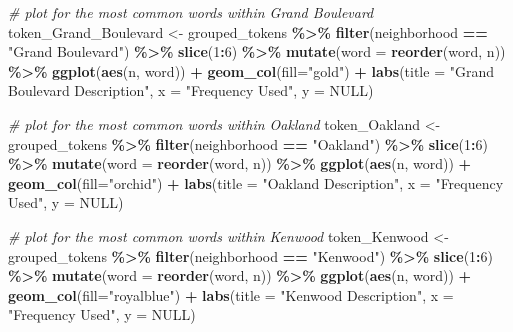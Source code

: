 \documentclass[
]{article}
\newenvironment{Shaded}{\begin{snugshade}}{\end{snugshade}}
\newcommand{\AttributeTok}[1]{\textcolor[rgb]{0.13,0.29,0.53}{#1}}
\newcommand{\CommentTok}[1]{\textcolor[rgb]{0.56,0.35,0.01}{\textit{#1}}}
\newcommand{\ConstantTok}[1]{\textcolor[rgb]{0.56,0.35,0.01}{#1}}
\newcommand{\DecValTok}[1]{\textcolor[rgb]{0.00,0.00,0.81}{#1}}
\newcommand{\FunctionTok}[1]{\textcolor[rgb]{0.13,0.29,0.53}{\textbf{#1}}}
\newcommand{\NormalTok}[1]{#1}
\newcommand{\OtherTok}[1]{\textcolor[rgb]{0.56,0.35,0.01}{#1}}
\newcommand{\SpecialCharTok}[1]{\textcolor[rgb]{0.81,0.36,0.00}{\textbf{#1}}}
\newcommand{\StringTok}[1]{\textcolor[rgb]{0.31,0.60,0.02}{#1}}
\begin{document}
\begin{Shaded}
\begin{Highlighting}[]
\CommentTok{\# plot for the most common words within Grand Boulevard}
\NormalTok{token\_Grand\_Boulevard }\OtherTok{\textless{}{-}}\NormalTok{ grouped\_tokens }\SpecialCharTok{\%\textgreater{}\%}
  \FunctionTok{filter}\NormalTok{(neighborhood }\SpecialCharTok{==} \StringTok{"Grand Boulevard"}\NormalTok{) }\SpecialCharTok{\%\textgreater{}\%}
  \FunctionTok{slice}\NormalTok{(}\DecValTok{1}\SpecialCharTok{:}\DecValTok{6}\NormalTok{) }\SpecialCharTok{\%\textgreater{}\%}
  \FunctionTok{mutate}\NormalTok{(}\AttributeTok{word =} \FunctionTok{reorder}\NormalTok{(word, n)) }\SpecialCharTok{\%\textgreater{}\%}
  \FunctionTok{ggplot}\NormalTok{(}\FunctionTok{aes}\NormalTok{(n, word)) }\SpecialCharTok{+}
  \FunctionTok{geom\_col}\NormalTok{(}\AttributeTok{fill=}\StringTok{"gold"}\NormalTok{) }\SpecialCharTok{+}
  \FunctionTok{labs}\NormalTok{(}\AttributeTok{title =} \StringTok{"Grand Boulevard Description"}\NormalTok{, }\AttributeTok{x =} \StringTok{"Frequency Used"}\NormalTok{, }\AttributeTok{y =} \ConstantTok{NULL}\NormalTok{)}

\CommentTok{\# plot for the most common words within Oakland}
\NormalTok{token\_Oakland }\OtherTok{\textless{}{-}}\NormalTok{ grouped\_tokens }\SpecialCharTok{\%\textgreater{}\%}
  \FunctionTok{filter}\NormalTok{(neighborhood }\SpecialCharTok{==} \StringTok{"Oakland"}\NormalTok{) }\SpecialCharTok{\%\textgreater{}\%}
  \FunctionTok{slice}\NormalTok{(}\DecValTok{1}\SpecialCharTok{:}\DecValTok{6}\NormalTok{) }\SpecialCharTok{\%\textgreater{}\%}
  \FunctionTok{mutate}\NormalTok{(}\AttributeTok{word =} \FunctionTok{reorder}\NormalTok{(word, n)) }\SpecialCharTok{\%\textgreater{}\%}
  \FunctionTok{ggplot}\NormalTok{(}\FunctionTok{aes}\NormalTok{(n, word)) }\SpecialCharTok{+}
  \FunctionTok{geom\_col}\NormalTok{(}\AttributeTok{fill=}\StringTok{"orchid"}\NormalTok{) }\SpecialCharTok{+}
  \FunctionTok{labs}\NormalTok{(}\AttributeTok{title =} \StringTok{"Oakland Description"}\NormalTok{, }\AttributeTok{x =} \StringTok{"Frequency Used"}\NormalTok{, }\AttributeTok{y =} \ConstantTok{NULL}\NormalTok{)}

\CommentTok{\# plot for the most common words within Kenwood}
\NormalTok{token\_Kenwood }\OtherTok{\textless{}{-}}\NormalTok{ grouped\_tokens }\SpecialCharTok{\%\textgreater{}\%}
  \FunctionTok{filter}\NormalTok{(neighborhood }\SpecialCharTok{==} \StringTok{"Kenwood"}\NormalTok{) }\SpecialCharTok{\%\textgreater{}\%}
  \FunctionTok{slice}\NormalTok{(}\DecValTok{1}\SpecialCharTok{:}\DecValTok{6}\NormalTok{) }\SpecialCharTok{\%\textgreater{}\%}
  \FunctionTok{mutate}\NormalTok{(}\AttributeTok{word =} \FunctionTok{reorder}\NormalTok{(word, n)) }\SpecialCharTok{\%\textgreater{}\%}
  \FunctionTok{ggplot}\NormalTok{(}\FunctionTok{aes}\NormalTok{(n, word)) }\SpecialCharTok{+}
  \FunctionTok{geom\_col}\NormalTok{(}\AttributeTok{fill=}\StringTok{"royalblue"}\NormalTok{) }\SpecialCharTok{+}
  \FunctionTok{labs}\NormalTok{(}\AttributeTok{title =} \StringTok{"Kenwood Description"}\NormalTok{, }\AttributeTok{x =} \StringTok{"Frequency Used"}\NormalTok{, }\AttributeTok{y =} \ConstantTok{NULL}\NormalTok{)}


\end{Highlighting}
\end{Shaded}
\end{document}
